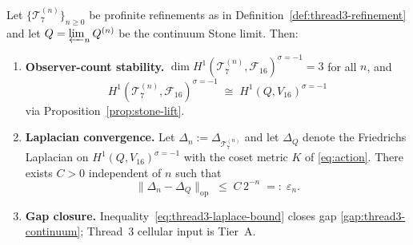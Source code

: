 \begin{theorem}
\label{thm:thread3-continuum}
Let $\{\mathcal{T}_7^{(n)}\}_{n\ge 0}$ be profinite refinements as in
Definition~\ref{def:thread3-refinement} and let $Q=\varprojlim_n Q^{(n)}$ be
the continuum Stone limit. Then:
\begin{enumerate}[label=(\roman*),leftmargin=*]
  \item \textbf{Observer-count stability.}
    $\dim H^1(\mathcal{T}_7^{(n)},\mathcal{F}_{16})^{\sigma=-1}=3$ for all
    $n$, and
    \begin{equation}\label{eq:thread3-h1-stable}
      H^1(\mathcal{T}_7^{(n)},\mathcal{F}_{16})^{\sigma=-1}
      \;\cong\;
      H^1(Q,V_{16})^{\sigma=-1}
    \end{equation}
    via Proposition~\ref{prop:stone-lift}.
  \item \textbf{Laplacian convergence.}
    Let $\Delta_n:=\Delta_{\mathcal{T}_7^{(n)}}$ and let $\Delta_Q$ denote the
    Friedrichs Laplacian on $H^1(Q,V_{16})^{\sigma=-1}$ with the coset metric
    $K$ of \eqref{eq:action}. There exists $C>0$ independent of $n$ such that
    \begin{equation}\label{eq:thread3-laplace-bound}
      \bigl\|\Delta_n-\Delta_Q\bigr\|_{\mathrm{op}}
      \;\le\;
      C\,2^{-n}
      \;=:\;
      \varepsilon_n.
    \end{equation}
  \item \textbf{Gap closure.}
    Inequality~\eqref{eq:thread3-laplace-bound} closes gap
    \ref{gap:thread3-continuum}; Thread~3 cellular input is Tier~A.
\end{enumerate}
\end{theorem}


